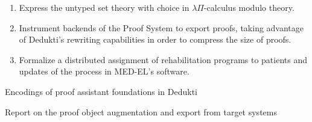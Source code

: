 \begin{workpackage}[id=theories,wphases=0-48,type=RTD,
  short=Theories in Dedukti,%
  title= Defining theories in Dedukti,
  lead=Inn,
  InnRM=6,
  BiaRM=48,
  LmuRM=12,
  SacRM=36,
  InrRM=24,
  ]
\begin{tasklist}
\begin{task}[id=tla,
  title=Express the theory of \tlaplus in Dedukti,
  lead=Inr,   %
  InrRM=0,   %
  MedRM=0    %
  ]
  \begin{enumerate}
  \item Express the untyped \tlaplus set theory with choice in
    $\lambda\Pi$-calculus modulo theory.
  \item Instrument backends of the \tlaplus Proof System to export proofs,
    taking advantage of Dedukti's rewriting capabilities in order to compress
    the size of proofs.
  \item Formalize a distributed assignment of rehabilitation programs to
    patients and updates of the process in MED-EL's software.
  \end{enumerate}
\end{task}

\end{tasklist}

\begin{wpdelivs}
  \begin{wpdeliv}[due=30,id=wp2encodings,dissem=PU,nature=P,lead=Inr]
      {Encodings of proof assistant foundations in Dedukti}
  \end{wpdeliv}
  \begin{wpdeliv}[due=36,id=wp2proofobj,dissem=PU,nature=R,lead=Bia]
      {Report on the proof object augmentation and export from target systems}
  \end{wpdeliv}
\end{wpdelivs}
\end{workpackage}


